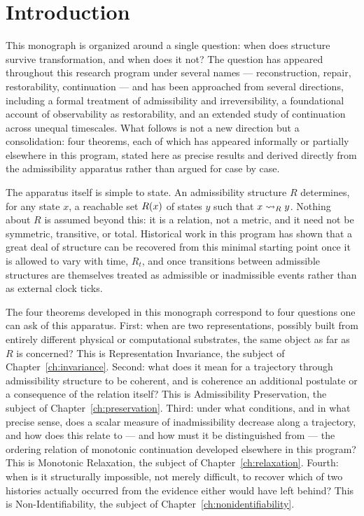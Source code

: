 \chapter{Introduction}
\label{ch:introduction}

This monograph is organized around a single question: when does structure
survive transformation, and when does it not? The question has appeared
throughout this research program under several names --- reconstruction,
repair, restorability, continuation --- and has been approached from
several directions, including a formal treatment of admissibility and
irreversibility, a foundational account of observability as restorability,
and an extended study of continuation across unequal timescales. What
follows is not a new direction but a consolidation: four theorems, each
of which has appeared informally or partially elsewhere in this program,
stated here as precise results and derived directly from the admissibility
apparatus rather than argued for case by case.

The apparatus itself is simple to state. An admissibility structure $R$
determines, for any state $x$, a reachable set $R(x)$ of states $y$
such that $x \rightsquigarrow_{R} y$. Nothing about $R$ is assumed beyond this: it is
a relation, not a metric, and it need not be symmetric, transitive, or
total. Historical work in this program has shown that a great deal of
structure can be recovered from this minimal starting point once it is
allowed to vary with time, $R_t$, and once transitions between admissible
structures are themselves treated as admissible or inadmissible events
rather than as external clock ticks.

The four theorems developed in this monograph correspond to four
questions one can ask of this apparatus. First: when are two
representations, possibly built from entirely different physical or
computational substrates, the same object as far as $R$ is concerned?
This is Representation Invariance, the subject of Chapter~\ref{ch:invariance}.
Second: what does it mean for a trajectory through admissibility structure
to be coherent, and is coherence an additional postulate or a consequence
of the relation itself? This is Admissibility Preservation, the subject
of Chapter~\ref{ch:preservation}. Third: under what conditions, and in
what precise sense, does a scalar measure of inadmissibility decrease
along a trajectory, and how does this relate to --- and how must it be
distinguished from --- the ordering relation of monotonic continuation
developed elsewhere in this program? This is Monotonic Relaxation, the
subject of Chapter~\ref{ch:relaxation}. Fourth: when is it structurally
impossible, not merely difficult, to recover which of two histories
actually occurred from the evidence either would have left behind? This
is Non-Identifiability, the subject of Chapter~\ref{ch:nonidentifiability}.


